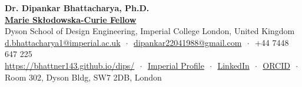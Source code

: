 \documentclass[11pt,a4paper]{article}
\newcommand{\makerubric}[1]{}
\begin{document}
\begin{center}
  {\Huge\bfseries\sffamily\color{accent} Dr. Dipankar Bhattacharya, Ph.D.}\\[0.5em]
  {\large\bfseries \href{https://cordis.europa.eu/project/id/101205678}{Marie Sk\l{}odowska-Curie Fellow}}\\
  Dyson School of Design Engineering, Imperial College London, United Kingdom\\[0.8em]
  \small
  \href{mailto:d.bhattacharya1@imperial.ac.uk}{d.bhattacharya1@imperial.ac.uk} $\,\cdot\,$ 
  \href{mailto:dipankar22041988@gmail.com}{dipankar22041988@gmail.com} $\,\cdot\,$ 
  +44 7448 647 225\\
  \href{https://bhattner143.github.io/dips/}{https://bhattner143.github.io/dips/} $\,\cdot\,$
  \href{https://profiles.imperial.ac.uk/d.bhattacharya1/about}{Imperial Profile} $\,\cdot\,$
  \href{https://www.linkedin.com/in/dipankar-bhattacharya-phd-imperial}{LinkedIn} $\,\cdot\,$
  \href{https://orcid.org/0000-0002-4737-9818}{ORCID}
  $\,\cdot\,$ 
  Room 302, Dyson Bldg, SW7 2DB, London
\end{center}

\vspace{0.5em}


\makerubric{education}
\makerubric{employment}
\makerubric{teaching}

\makerubric{citations}
\makerubric{grants}
\makerubric{academic}
\makerubric{skills}
\end{document}
